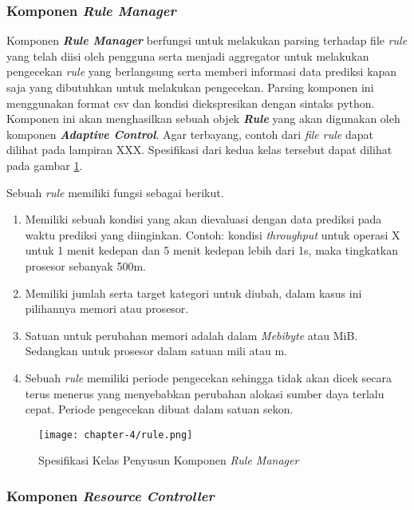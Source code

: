 \subsubsection{Komponen \textit{Rule Manager}}
Komponen \textbf{\textit{Rule Manager}} berfungsi untuk melakukan parsing terhadap file \textit{rule} yang telah diisi oleh pengguna serta menjadi aggregator untuk melakukan pengecekan \textit{rule} yang berlangsung serta memberi informasi data prediksi kapan saja yang dibutuhkan untuk melakukan pengecekan. Parsing komponen ini menggunakan format csv dan kondisi diekspresikan dengan sintaks python. Komponen ini akan menghasilkan sebuah objek \textbf{\textit{Rule}} yang akan digunakan oleh komponen \textbf{\textit{Adaptive Control}}. Agar terbayang, contoh dari \textit{file rule} dapat dilihat pada lampiran XXX. Spesifikasi dari kedua kelas tersebut dapat dilihat pada gambar \ref{fig:rule-spek}.


Sebuah \textit{rule} memiliki fungsi sebagai berikut.
\begin{enumerate}
    \item Memiliki sebuah kondisi yang akan dievaluasi dengan data prediksi pada waktu prediksi yang diinginkan. Contoh: kondisi \textit{throughput} untuk operasi X untuk 1 menit kedepan dan 5 menit kedepan lebih dari 1s, maka tingkatkan prosesor sebanyak 500m.
    \item Memiliki jumlah serta target kategori untuk diubah, dalam kasus ini pilihannya memori atau prosesor.
    \item Satuan untuk perubahan memori adalah dalam \textit{Mebibyte} atau MiB. Sedangkan untuk prosesor dalam satuan mili atau m.
    \item Sebuah \textit{rule} memiliki periode pengecekan sehingga tidak akan dicek secara terus menerus yang menyebabkan perubahan alokasi sumber daya terlalu cepat. Periode pengecekan dibuat dalam satuan sekon.
\end{enumerate}

\begin{figure}[h]
    \centering
    \texttt{[image: chapter-4/rule.png]}
    \caption{Spesifikasi Kelas Penyusun Komponen \textit{Rule Manager}}
    \label{fig:rule-spek}
\end{figure}

\subsubsection{Komponen \textit{Resource Controller}}

